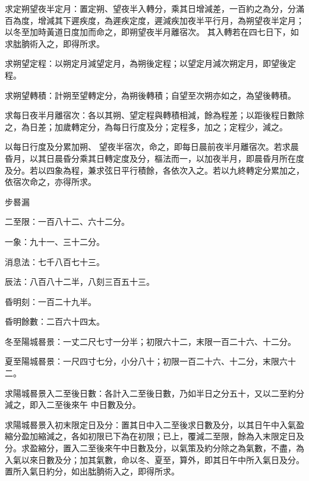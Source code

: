 \begin{pinyinscope}
 求定朔望夜半定月：置定朔、望夜半入轉分，乘其日增減差，一百約之為分，分滿百為度，增減其下遲疾度，為遲疾定度，遲減疾加夜半平行月，為朔望夜半定月；以冬至加時黃道日度加而命之，即朔望夜半月離宿次。
 其入轉若在四七日下，如求朏朒術入之，即得所求。



 求朔望定程：以朔定月減望定月，為朔後定程；以望定月減次朔定月，即望後定程。



 求朔望轉積：計朔至望轉定分，為朔後轉積；自望至次朔亦如之，為望後轉積。



 求每日夜半月離宿次：各以其朔、望定程與轉積相減，餘為程差；以距後程日數除之，為日差；加歲轉定分，為每日行度及分；定程多，加之；定程少，減之。



 以每日行度及分累加朔、
 望夜半宿次，命之，即每日晨前夜半月離宿次。若求晨昏月，以其日晨昏分乘其日轉定度及分，樞法而一，以加夜半月，即晨昏月所在度及分。若以四象為程，兼求弦日平行積餘，各依次入之。若以九終轉定分累加之，依宿次命之，亦得所求。



 步晷漏



 二至限：一百八十二、六十二分。



 一象：九十一、三十二分。



 消息法：七千八百七十三。



 辰法：八百八十二半，八刻三百五十三。



 昏明刻：一百二十九半。



 昏明餘數：二百六十四太。



 冬至陽城晷景：一丈二尺七寸一分半；初限六十二，末限一百二十六、十二分。



 夏至陽城晷景：一尺四寸七分，小分八十；初限一百二十六、十二分，末限六十二。



 求陽城晷景入二至後日數：各計入二至後日數，乃如半日之分五十，又以二至約分減之，即入二至後來午
 中日數及分。



 求陽城晷景入初末限定日及分：置其日中入二至後求日數及分，以其日午中入氣盈縮分盈加縮減之，各如初限已下為在初限；已上，覆減二至限，餘為入末限定日及分。求盈縮分，置入二至後來午中日數及分，以氣策及約分除之為氣數，不盡，為入氣以來日數及分；加其氣數，命以冬、夏至，算外，即其日午中所入氣日及分。置所入氣日約分，如出朏朒術入之，即得所求。




\end{pinyinscope}
